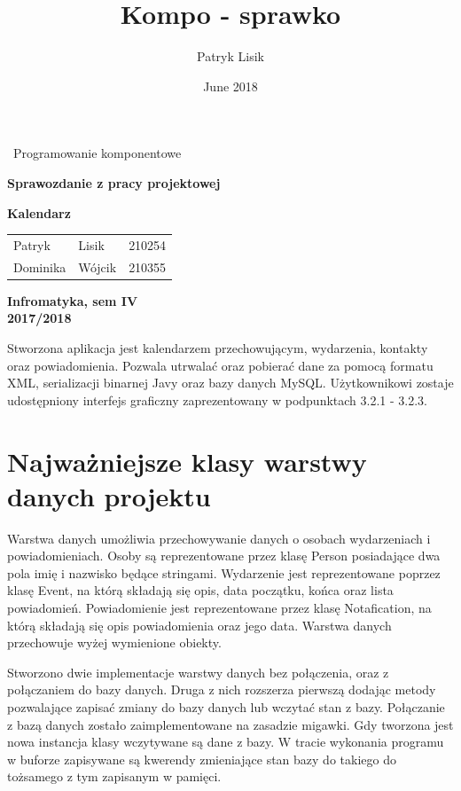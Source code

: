 \documentclass[a4paper,12pt]{article}
\title{Kompo - sprawko}
\author{Patryk Lisik}
\date{June 2018}
\begin{document}
\begin{titlepage}
\vspace{10cm}


\centering
{\center\huge\ Programowanie komponentowe \par}
\vspace{1.5cm}
{\center\huge\bfseries Sprawozdanie z pracy projektowej  \par}
\vspace{1.5cm}
{\center\huge\bfseries Kalendarz}

\vspace{6cm}


\begin{flushright}
\begin{tabular}{lll}
Patryk & Lisik & 210254 \\ 
Dominika & Wójcik  & 210355 \\ 
\end{tabular} 
\end{flushright}

\vspace{5cm}

\begin{center}
\textbf{Infromatyka, sem IV \\}
\textbf{2017/2018}
\end{center}
 

\end{titlepage}

Stworzona aplikacja jest kalendarzem przechowującym, wydarzenia, kontakty oraz powiadomienia. Pozwala utrwalać oraz pobierać dane za pomocą formatu XML, serializacji binarnej Javy oraz bazy danych MySQL. Użytkownikowi zostaje udostępniony interfejs graficzny zaprezentowany w podpunktach 3.2.1 -  3.2.3. 
       
\section{Najważniejsze klasy warstwy danych projektu}
Warstwa danych umożliwia przechowywanie danych o osobach wydarzeniach i powiadomieniach. Osoby są reprezentowane przez klasę Person posiadające dwa pola imię i nazwisko będące stringami. Wydarzenie jest reprezentowane poprzez klasę Event, na którą składają się opis, data początku, końca oraz lista powiadomień. Powiadomienie jest reprezentowane przez klasę Notafication, na którą składają się opis powiadomienia oraz jego data. 
Warstwa danych przechowuje wyżej wymienione obiekty.

Stworzono dwie implementacje warstwy danych bez połączenia, oraz z połączaniem do bazy danych. Druga z nich rozszerza pierwszą dodając metody pozwalające zapisać zmiany do bazy danych lub wczytać stan z bazy. Połączanie z bazą danych zostało zaimplementowane na zasadzie migawki. Gdy tworzona jest nowa instancja klasy wczytywane są dane z bazy. W tracie wykonania programu w buforze zapisywane są kwerendy zmieniające stan bazy do takiego do tożsamego z tym zapisanym w pamięci. 
\end{document}

